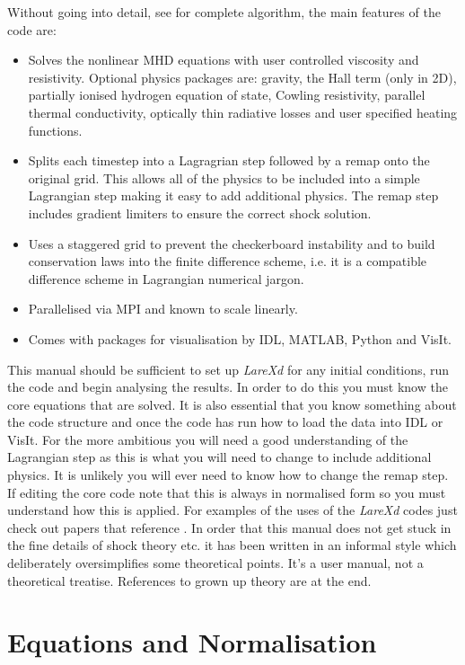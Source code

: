 \documentclass[11pt]{article}
\begin{document}
Without going into detail, see \cite{jcp} for complete algorithm, the main features of the code are:
\begin{itemize}
 \item Solves the nonlinear MHD equations with user controlled viscosity and resistivity. Optional physics packages are: gravity, the Hall term (only in 2D), partially ionised hydrogen equation of state, Cowling resistivity, parallel thermal conductivity, optically thin radiative losses and user specified heating functions.
 \item Splits each timestep into a Lagragrian step followed by a remap onto the original grid. This allows all of the physics to be included into a simple Lagrangian step making it easy to add additional physics. The remap step includes gradient limiters to ensure the correct shock solution.
 \item Uses a staggered grid to prevent the checkerboard instability and to build conservation laws into the finite difference scheme, i.e. it is a compatible difference scheme in Lagrangian numerical jargon.
 \item Parallelised via MPI and known to scale linearly.
 \item Comes with packages for visualisation by IDL, MATLAB, Python and VisIt. \cite{visit}
\end{itemize}

This manual should be sufficient to set up {\it LareXd} for any initial conditions, run the code and begin analysing the results. In order to do this you must know the core equations that are solved. It is also essential that you know something about the code structure and once the code has run how to load the data into IDL or VisIt. For the more ambitious you will need a good understanding of the Lagrangian step as this is what you will need to change to include additional physics. It is unlikely you will ever need to know how to change the remap step. If editing the core code note that this is always in normalised form so you must understand how this is applied. For examples of the uses of the {\it LareXd} codes just check out papers that reference \cite{jcp}. In order that this manual does not get stuck in the fine details of shock theory etc. it has been written in an informal style which deliberately oversimplifies some theoretical points. It's a user manual, not a theoretical treatise. References to grown up theory are at the end.



\section{Equations and Normalisation}
\end{document}
